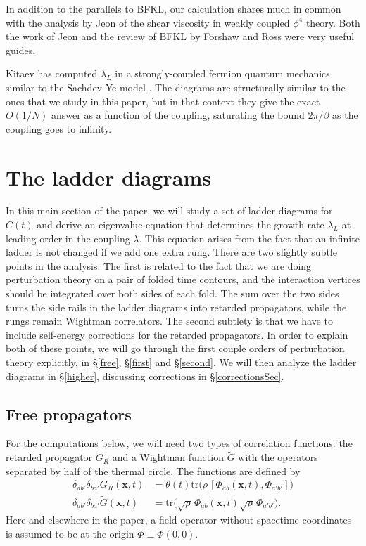 \documentclass[12pt]{article}
\newcommand{\tr}{\text{tr}}
\begin{document}
In addition to the parallels to BFKL, our calculation shares much in common with the analysis by Jeon \cite{jeon} of the shear viscosity in weakly coupled $\phi^4$ theory. Both the work of Jeon and the review of BFKL by Forshaw and Ross \cite{Forshaw:1997dc} were very useful guides. 

Kitaev \cite{kitaev2} has computed $\lambda_L$ in a strongly-coupled fermion quantum mechanics similar to the Sachdev-Ye model \cite{ Sachdev:1992fk, parcolletgeorges,Sachdev:2015efa}. The diagrams are structurally similar to the ones that we study in this paper, but in that context they give the exact $O(1/N)$ answer as a function of the coupling, saturating the bound $2\pi/\beta$ as the coupling goes to infinity.

\section{The ladder diagrams}\label{ladder}
In this main section of the paper, we will study a set of ladder diagrams for $C(t)$ and derive an eigenvalue equation that determines the growth rate $\lambda_L$ at leading order in the coupling $\lambda$. This equation arises from the fact that an infinite ladder is not changed if we add one extra rung. There are two slightly subtle points in the analysis. The first is related to the fact that we are doing perturbation theory on a pair of folded time contours, and the interaction vertices should be integrated over both sides of each fold. The sum over the two sides turns the side rails in the ladder diagrams into retarded propagators, while the rungs remain Wightman correlators. The second subtlety is that we have to include self-energy corrections for the retarded propagators. In order to explain both of these points, we will go through the first couple orders of perturbation theory explicitly, in \S\ref{free}, \S\ref{first} and \S\ref{second}. We will then analyze the ladder diagrams in \S\ref{higher}, discussing corrections in \S\ref{correctionsSec}.

\subsection{Free propagators}
For the computations below, we will need two types of correlation functions: the retarded propagator $G_R$ and a Wightman function $\tilde{G}$ with the operators separated by half of the thermal circle. The functions are defined by
\begin{align}
\delta_{ab'}\delta_{ba'}G_R(\mathbf{x},t)&= \theta(t) \tr\Big(\rho\,  [\Phi_{ab}(\mathbf{x},t),\Phi_{a'b'}]\Big)\\
\delta_{ab'}\delta_{ba'}\tilde{G}(\mathbf{x},t)&=\tr\Big(\sqrt{\rho}\, \Phi_{ab}(\mathbf{x},t)\sqrt{\rho}\,\Phi_{a'b'}\Big) .
\end{align}
Here and elsewhere in the paper, a field operator without spacetime coordinates is assumed to be at the origin $\Phi\equiv \Phi(0,0)$.
\end{document}
